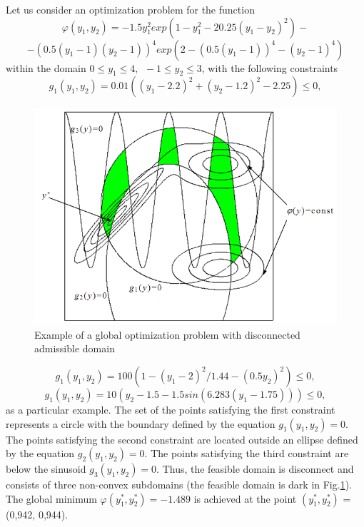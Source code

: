 Let us consider an optimization problem  for the function
\begin{displaymath}
\label{eq:12}
\varphi(y_1,y_2)=-1.5y_1^2exp(1-y_1^2-20.25(y_1-y_2)^2)-
\end{displaymath}
\begin{displaymath}
\label{eq:12}
-(0.5(y_1-1)(y_2-1))^4exp(2-(0.5(y_1-1))^4-(y_2-1)^4)
\end{displaymath}
within the domain $0 \leq y_1\leq 4,\ \  -1\leq y_2\leq 3$, with the following constraints 
\begin{displaymath}
g_1(y_1,y_2)=0.01((y_1-2.2)^2+(y_2-1.2)^2-2.25)\leq 0,
\end{displaymath}
\begin{figure}[t]
\includegraphics[width=0.7\linewidth]{figures/figure1_1.png}
\caption{Example of a global optimization problem with disconnected admissible domain}
\label{1_fig_1}    
\end{figure}
\begin{displaymath}
g_1(y_1,y_2)=100(1-(y_1-2)^2/1.44-(0.5y_2)^2)\leq 0,
\end{displaymath}
\begin{displaymath}
g_1(y_1,y_2)=10(y_2-1.5-1.5sin(6.283(y_1-1.75)))\leq 0,
\end{displaymath}
as a particular example.
The set of the points satisfying the first constraint represents a circle with the boundary defined by the equation $g_1(y_1,y_2)=0$. The points satisfying the second constraint are located outside an ellipse defined by the equation $g_2(y_1,y_2)=0$. The points satisfying the third constraint are below the sinusoid $g_3(y_1,y_2)=0$. Thus, the feasible domain is disconnect and consists of three non-convex subdomains (the feasible domain is dark in Fig.\ref{1_fig_1}). The global minimum $\varphi(y_1^*,y_2^*)=-1.489$  is achieved at the point $(y_1^*,y_2^*)$  = (0,942, 0,944).

